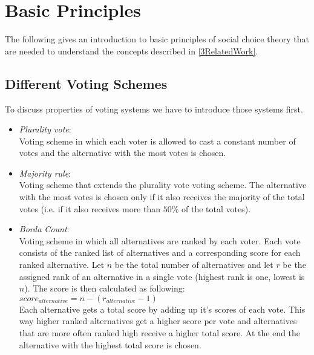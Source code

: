\documentclass[conference]{IEEEtran}
\begin{document}
\section{Basic Principles}\label{2BasicPrinciples}
The following gives an introduction to basic principles of social choice theory that are needed to understand the concepts described in \ref{3RelatedWork}.
\subsection{Different Voting Schemes}
To discuss properties of voting systems we have to introduce those systems first.
\begin{itemize}
    \item \textit{Plurality vote}:\\
    Voting scheme in which each voter is allowed to cast a constant number of votes and the alternative with the most votes is chosen.

    \item \textit{Majority rule}:\\
    Voting scheme that extends the plurality vote voting scheme. The alternative with the most votes is chosen only if it also receives the majority of the total votes (i.e. if it also receives more than $50\%$ of the total votes).

    \item \textit{Borda Count}:\\
    Voting scheme in which all alternatives are ranked by each voter. Each vote consists of the ranked list of alternatives and a corresponding score for each ranked alternative. Let $n$ be the total number of alternatives and let $r$ be the assigned rank of an alternative in a single vote (highest rank is one, lowest is $n$). The score is then calculated as following:\\
    $score_{alternative}=n-(r_{alternative}-1)$\\
    Each alternative gets a total score by adding up it's scores of each vote. This way higher ranked alternatives get a higher score per vote and alternatives that are more often ranked high receive a higher total score. At the end the alternative with the highest total score is chosen.
\end{itemize}

\end{document}
